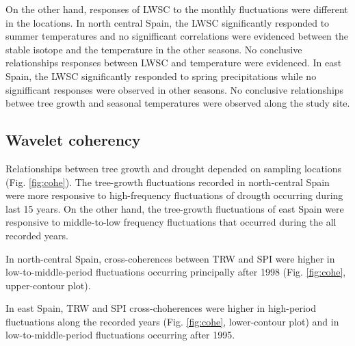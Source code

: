 \documentclass[review,authoryear]{elsarticle}
\begin{document}
On the other hand, responses of \gls{LWSC} to the monthly fluctuations
were different in the locations. In north central Spain, the
\gls{LWSC} significantly responded to summer temperatures and no
signifficant correlations were evidenced between the stable isotope
and the temperature in the other seasons. No conclusive relationships
responses between \gls{LWSC} and temperature were evidenced. In east
Spain, the \gls{LWSC} significantly responded to spring precipitations
while no signifficant responses were observed in other seasons. No
conclusive relationships betwee tree growth and seasonal temperatures
were observed along the study site.

\subsection{Wavelet coherency}
Relationships between tree growth and drought depended on sampling
locations (Fig. \ref{fig:cohe}). The tree-growth fluctuations
recorded in north-central Spain were more responsive to high-frequency
fluctuations of drougth occurring during last 15 years. On the other
hand, the tree-growth fluctuations of east Spain were responsive to
middle-to-low frequency fluctuations that occurred during the all
recorded years.

In north-central Spain, cross-coherences between \gls{TRW} and
\gls{SPI} were higher in low-to-middle-period fluctuations occurring
principally after 1998 (Fig. \ref{fig:cohe}, upper-contour
plot). 

In east Spain, \gls{TRW} and \gls{SPI} cross-choherences were higher
in high-period fluctuations along the recorded years
(Fig. \ref{fig:cohe}, lower-contour plot) and in low-to-middle-period
fluctuations occurring after 1995.



\newpage
\section{\refname}


\end{document}
